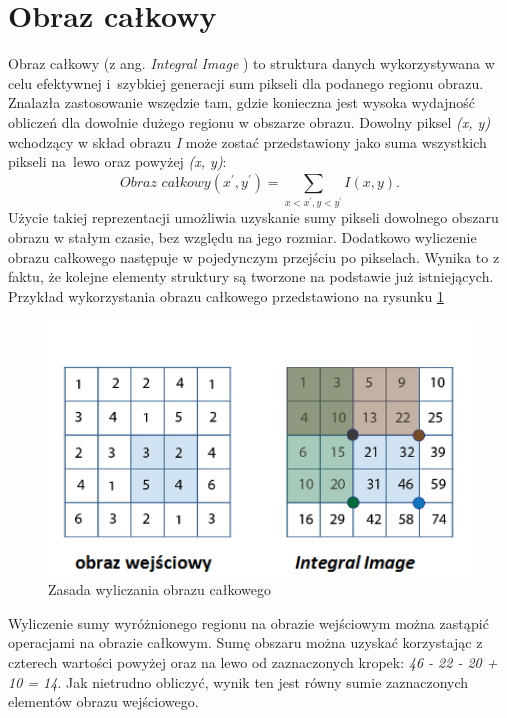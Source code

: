 \section{Obraz całkowy}
\label{sec:IntegralImage}
Obraz całkowy (z ang. \textit{Integral Image} \cite{ViolaJonesIntegralImage}) to struktura danych wykorzystywana w celu efektywnej i~szybkiej generacji sum pikseli dla podanego regionu obrazu. Znalazła zastosowanie wszędzie tam, gdzie konieczna jest wysoka wydajność obliczeń dla dowolnie dużego regionu w obszarze obrazu. Dowolny piksel \textit{(x, y)} wchodzący w skład obrazu \textit{I} może zostać przedstawiony jako suma wszystkich pikseli na~lewo oraz powyżej \textit{(x, y)}:
\begin{equation}
\textit{Obraz całkowy}(x^{'},y^{'}) = \sum_{x<x^{'},y<y^{'}}^{}I(x,y).
\end{equation}
Użycie takiej reprezentacji umożliwia uzyskanie sumy pikseli dowolnego obszaru obrazu w stałym czasie, bez względu na jego rozmiar. Dodatkowo wyliczenie obrazu całkowego następuje w pojedynczym przejściu po pikselach. Wynika to z faktu, że kolejne elementy struktury są tworzone na podstawie już istniejących. Przykład wykorzystania obrazu całkowego  przedstawiono na rysunku \ref{im: Integral Image} 

\begin{figure}[h]
	\includegraphics[width=15cm]{integral_image}
	\centering
	\caption{Zasada wyliczania obrazu całkowego}
	\label{im: Integral Image}
\end{figure}    

Wyliczenie sumy wyróżnionego regionu na obrazie wejściowym można zastąpić operacjami na obrazie całkowym. Sumę obszaru można uzyskać korzystając z czterech wartości powyżej oraz na lewo od zaznaczonych kropek: \textit{46 - 22 - 20 + 10 = 14}. Jak nietrudno obliczyć, wynik ten jest równy sumie zaznaczonych elementów obrazu wejściowego.

